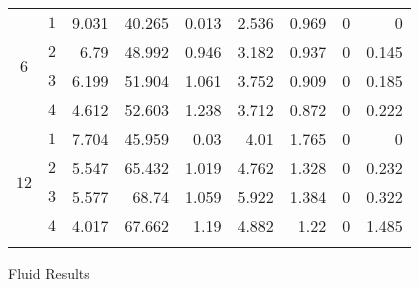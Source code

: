 \begin{figure}
{{\begin{tabular}{c@{\hspace{2pt}}cD{.}{.}{3}D{.}{.}{3}@{\hspace{2pt}}D{.}{.}{3}@{\hspace{2pt}}D{.}{.}{3}@{\hspace{2pt}}D{.}{.}{3}@{\hspace{2pt}}D{.}{.}{3}@{\hspace{2pt}}D{.}{.}{3}}
\midrule
{} & $1$ & 9.031 & 40.265 & 0.013 & 2.536 & 0.969 & 0 & 0\\
 & $2$ & 6.79 & 48.992 & 0.946 & 3.182 & 0.937 & 0 & 0.145\\
 & $3$ & 6.199 & 51.904 & 1.061 & 3.752 & 0.909 & 0 & 0.185\\
 & $4$ & 4.612 & 52.603 & 1.238 & 3.712 & 0.872 & 0 & 0.222\\
\midrule
{} & $1$ & 7.704 & 45.959 & 0.03 & 4.01 & 1.765 & 0 & 0\\
 & $2$ & 5.547 & 65.432 & 1.019 & 4.762 & 1.328 & 0 & 0.232\\
 & $3$ & 5.577 & 68.74 & 1.059 & 5.922 & 1.384 & 0 & 0.322\\
 & $4$ & 4.017 & 67.662 & 1.19 & 4.882 & 1.22 & 0 & 1.485\\
\bottomrule \\
    \end{tabular}
}
    \label{sfig:results2:timers}
  }

  \caption{Fluid Results}
\end{figure}
